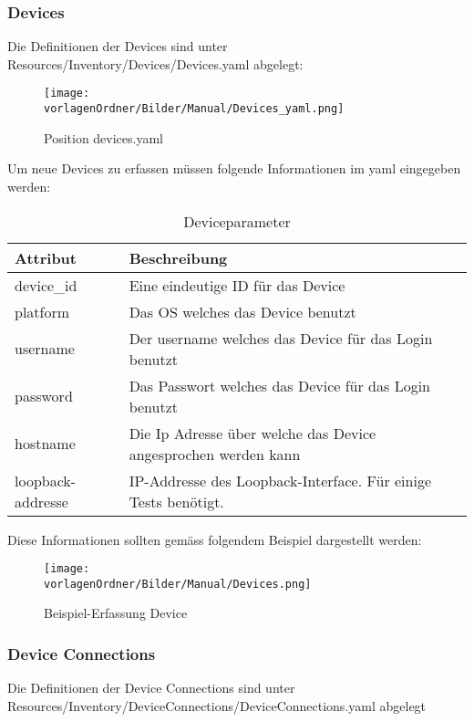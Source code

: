 \documentclass[]{subfiles}
\begin{document}
	\subsubsection{Devices}
		Die Definitionen der Devices sind unter Resources/Inventory/Devices/Devices.yaml abgelegt:

		\begin{figure}[h!]
			\begin{center}
				\texttt{[image: \\vorlagenOrdner/Bilder/Manual/Devices\_yaml.png]}
				\caption{Position devices.yaml}
			\end{center}
		\end{figure}

		Um neue Devices zu erfassen müssen folgende Informationen im yaml eingegeben werden:\\
		\begin{table}
			\begin{tabularx}{\textwidth}{lX}
			\toprule
			Attribut & Beschreibung \\
			\midrule
			device\_id & Eine eindeutige ID für das Device \\
			platform & Das OS welches das Device benutzt \\
			username & Der username welches das Device für das Login benutzt\\
			password & Das Passwort welches das Device für das Login benutzt\\
			hostname & Die Ip Adresse über welche das Device angesprochen werden kann\\
			loopback-addresse & IP-Addresse des Loopback-Interface. Für einige Tests benötigt.\\
			\midrule
			\end{tabularx}
			\caption{Deviceparameter}
		\end{table}
		
		Diese Informationen sollten gemäss folgendem Beispiel dargestellt werden: 

		\begin{figure}[h!]
			\begin{center}
				\texttt{[image: \\vorlagenOrdner/Bilder/Manual/Devices.png]}
				\caption{Beispiel-Erfassung Device}
			\end{center}
		\end{figure}

	\subsubsection{Device Connections}
		Die Definitionen der Device Connections sind unter 
		Resources/Inventory/DeviceConnections/DeviceConnections.yaml abgelegt
\end{document}
